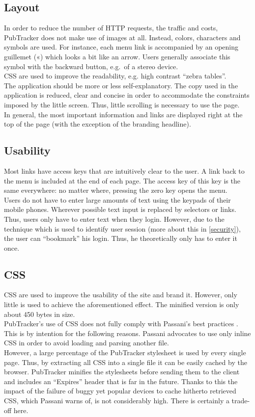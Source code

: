 \documentclass[a4paper,10pt]{scrartcl}
\begin{document}
\subsection{Layout}
In order to reduce the number of \ac{HTTP} requests, the traffic and costs,
PubTracker does not make use of images at all. Instead, colors, characters and
symbols are used. For instance, each menu link is accompanied by an opening guillemet («)
which looks a bit like an arrow. Users generally associate this symbol with the
backward button, e.g.\ of a stereo device.\\
\ac{CSS} are used to improve the readability, e.g. high contrast ``zebra
tables''.\\ The application should be more or less self-explanatory. The copy used in the
application is reduced, clear and concise in order to accommodate the
constraints imposed by the little screen. Thus, little
scrolling is necessary to use the page.\\
In general, the most important information and links are displayed right at the
top of the page (with the exception of the branding headline).

\subsection{Usability}
Most links have access keys that are intuitively clear to the user. A link back
to the menu is included at the end of each page. The access key of this key is
the same everywhere: no matter where, pressing the zero key opens the menu.\\
Users do not have to enter large amounts of text using the keypads of their
mobile phones. Wherever possible text input is replaced by selectors or links.
Thus, users only have to enter text when they login. However, due to the
technique which is used to identify user session (more about this in
\ref{security}), the user can ``bookmark'' his login. Thus, he theoretically
only has to enter it once.

\subsection{CSS}
\acs{CSS} are used to improve the usability of the site and brand it.
However, only little is used to achieve the aforementioned effect. The minified
version is only about 450 bytes in size.\\
PubTracker's use of \ac{CSS} does not fully comply with Passani's best
practices \cite{passani}. This is by intention for the following reasons.
Passani advocates to use only inline \ac{CSS} in order to avoid loading and
parsing another file.\\
However, a large percentage of the PubTracker stylesheet
is used by every single page. Thus, by extracting all \ac{CSS} into a single
file it can be easily cached by the browser. PubTracker minifies the
stylesheets before sending them to the client and includes an ``Expires''
header that is far in the future. Thanks to this the impact of the failure
of buggy yet popular devices to cache hitherto retrieved \ac{CSS}, which Passani
warns of, is not considerably high. There is certainly a trade-off here.
\end{document}
